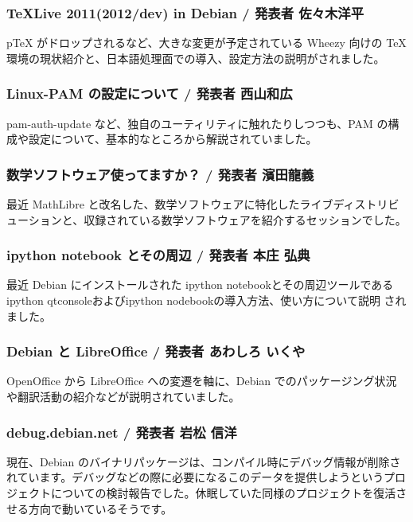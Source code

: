 \documentclass[mingoth,a4paper]{jsarticle}
\begin{document}
\subsubsection{TeXLive 2011(2012/dev) in Debian / 発表者 佐々木洋平}

pTeX がドロップされるなど、大きな変更が予定されている Wheezy 向けの \TeX 環境の現状紹介と、日本語処理面での導入、設定方法の説明がされました。

\subsubsection{Linux-PAM の設定について / 発表者 西山和広}

pam-auth-update など、独自のユーティリティに触れたりしつつも、PAM の構成や設定について、基本的なところから解説されていました。

\subsubsection{数学ソフトウェア使ってますか？ / 発表者 濱田龍義}

最近 MathLibre と改名した、数学ソフトウェアに特化したライブディストリビューションと、収録されている数学ソフトウェアを紹介するセッションでした。

\subsubsection{ipython notebook とその周辺 / 発表者 本庄 弘典}

最近 Debian にインストールされた ipython notebookとその周辺ツールである ipython qtconsoleおよびipython nodebookの導入方法、使い方について説明
されました。

\subsubsection{Debian と LibreOffice / 発表者 あわしろ いくや}

OpenOffice から LibreOffice への変遷を軸に、Debian でのパッケージング状況や翻訳活動の紹介などが説明されていました。

\subsubsection{debug.debian.net / 発表者 岩松 信洋}

現在、Debian のバイナリパッケージは、コンパイル時にデバッグ情報が削除されています。デバッグなどの際に必要になるこのデータを提供しようというプロジェクトについての検討報告でした。休眠していた同様のプロジェクトを復活させる方向で動いているそうです。
\end{document}
